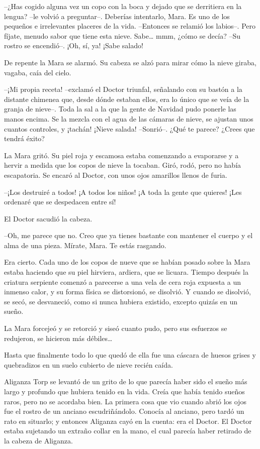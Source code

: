 --¿Has cogido alguna vez un copo con la boca y dejado que se derritiera en la lengua? --le volvió a preguntar--. Deberías intentarlo, Mara. Es uno de los pequeños e irrelevantes placeres de la vida. --Entonces se relamió los labios--. Pero fíjate, menudo sabor que tiene esta nieve. Sabe… mmm, ¿cómo se decía? --Su rostro se encendió--. ¡Oh, sí, ya! ¡Sabe salado!

De repente la Mara se alarmó. Su cabeza se alzó para mirar cómo la nieve giraba, vagaba, caía del cielo.

--¡Mi propia receta! --exclamó el Doctor triunfal, señalando con su bastón a la distante chimenea que, desde dónde estaban ellos, era lo único que se veía de la granja de nieve--. Toda la sal a la que la gente de Navidad pudo ponerle las manos encima. Se la mezcla con el agua de las cámaras de nieve, se ajustan unos cuantos controles, y ¡tachán! ¡Nieve salada! --Sonrió--. ¿Qué te parece? ¿Crees que tendrá éxito?

La Mara gritó. Su piel roja y escamosa estaba comenzando a evaporarse y a hervir a medida que los copos de nieve la tocaban. Giró, rodó, pero no había escapatoria. Se encaró al Doctor, con unos ojos amarillos llenos de furia.

--¡Los destruiré a todos! ¡A todos los niños! ¡A toda la gente que quieres! ¡Les ordenaré que se despedacen entre sí!

El Doctor sacudió la cabeza.

--Oh, me parece que no. Creo que ya tienes bastante con mantener el cuerpo y el alma de una pieza. Mírate, Mara. Te estás rasgando.

Era cierto. Cada uno de los copos de nueve que se habían posado sobre la Mara estaba haciendo que su piel hirviera, ardiera, que se licuara. Tiempo después la criatura serpiente comenzó a parecerse a una vela de cera roja expuesta a un inmenso calor, y su forma física se distorsionó, se disolvió. Y cuando se disolvió, se secó, se desvaneció, como si nunca hubiera existido, excepto quizás en un sueño.

La Mara forcejeó y se retorció y siseó cuanto pudo, pero sus esfuerzos se redujeron, se hicieron más débiles…

Hasta que finalmente todo lo que quedó de ella fue una cáscara de huesos grises y quebradizos en un suelo cubierto de nieve recién caída.



Aliganza Torp se levantó de un grito de lo que parecía haber sido el sueño más largo y profundo que hubiera tenido en la vida. Creía que había tenido sueños raros, pero no se acordaba bien. La primera cosa que vio cuando abrió los ojos fue el rostro de un anciano escudriñándolo. Conocía al anciano, pero tardó un rato en situarlo; y entonces Aliganza cayó en la cuenta: era el Doctor. El Doctor estaba sujetando un extraño collar en la mano, el cual parecía haber retirado de la cabeza de Aliganza.

